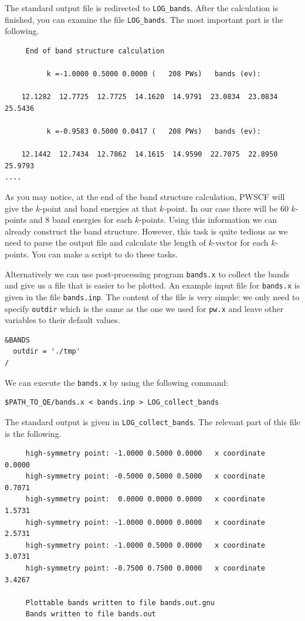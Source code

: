 \documentclass[12pt,english]{paper}
\begin{document}
The standard output file is redirected to \texttt{LOG\_bands}. After
the calculation is finished, you can examine the file \texttt{LOG\_bands}.
The most important part is the following.

\begin{lstlisting}
     End of band structure calculation

          k =-1.0000 0.5000 0.0000 (   208 PWs)   bands (ev):

    12.1282  12.7725  12.7725  14.1620  14.9791  23.0834  23.0834  25.5436

          k =-0.9583 0.5000 0.0417 (   208 PWs)   bands (ev):

    12.1442  12.7434  12.7862  14.1615  14.9590  22.7075  22.8950  25.9793
....
\end{lstlisting}


As you may notice, at the end of the band structure calculation, PWSCF
will give the $k$-point and band energies at that $k$-point. In
our case there will be 60 $k$-points and 8 band energies for each
$k$-points. Using this information we can already construct the band
structure. However, this task is quite tedious as we need to parse
the output file and calculate the length of $k$-vector for each $k$-points.
You can make a script to do these tasks.

Alternatively we can use post-processing program \texttt{bands.x}
to collect the bands and give us a file that is easier to be plotted.
An example input file for \texttt{bands.x} is given in the file \texttt{bands.inp}.
The content of the file is very simple: we only need to specify \texttt{outdir}
which is the same as the one we used for \texttt{pw.x} and leave other
variables to their default values.

\begin{lstlisting}
&BANDS
  outdir = './tmp'
/
\end{lstlisting}


We can execute the \texttt{bands.x} by using the following command:

\begin{lstlisting}
$PATH_TO_QE/bands.x < bands.inp > LOG_collect_bands
\end{lstlisting}


The standard output is given in \texttt{LOG\_collect\_bands}. The
relevant part of this file is the following.

\begin{lstlisting}
     high-symmetry point: -1.0000 0.5000 0.0000   x coordinate   0.0000
     high-symmetry point: -0.5000 0.5000 0.5000   x coordinate   0.7071
     high-symmetry point:  0.0000 0.0000 0.0000   x coordinate   1.5731
     high-symmetry point: -1.0000 0.0000 0.0000   x coordinate   2.5731
     high-symmetry point: -1.0000 0.5000 0.0000   x coordinate   3.0731
     high-symmetry point: -0.7500 0.7500 0.0000   x coordinate   3.4267

     Plottable bands written to file bands.out.gnu
     Bands written to file bands.out
\end{lstlisting}
\end{document}
